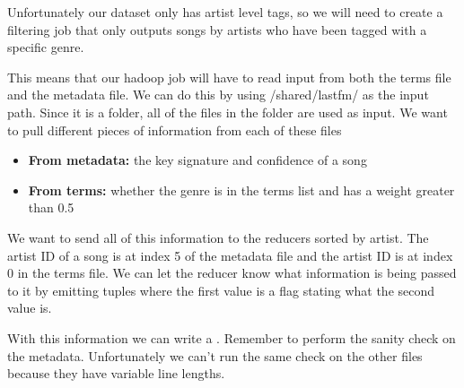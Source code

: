 \documentclass[letterpaper,10pt,openany,oneside]{sphinxmanual}
\begin{document}
Unfortunately our dataset only has artist level tags, so we will
need to create a filtering job that only outputs songs by artists
who have been tagged with a specific genre.

This means that our hadoop job will have to read input from
both the terms file and the metadata file. We can do this by
using /shared/lastfm/ as the input path. Since it is a folder,
all of the files in the folder are used as input. We want to pull
different pieces of information from each of these files
\begin{itemize}
\item {} 
\textbf{From metadata:} the key signature and confidence of a song

\item {} 
\textbf{From terms:} whether the genre is in the terms list and has
a weight greater than 0.5

\end{itemize}

We want to send all of this information to the reducers
sorted by artist. The artist ID of a song is at index 5 of the
metadata file and the artist ID is at index 0 in the terms file.
We can let the reducer know what information is being passed to
it by emitting tuples where the first value is a flag stating what
the second value is.

With this information we can write a .
Remember to perform
the sanity check on the metadata. Unfortunately we can't run
the same check on the other files because they have variable
line lengths.
\end{document}
